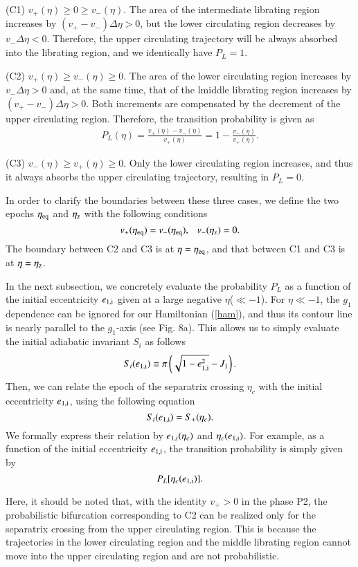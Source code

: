 \documentclass[useAMS,usenatbib,twocolumn]{mn2e}
\newcommand{\beq}{\begin{equation}}
\newcommand{\beqa}{\begin{eqnarray}}
\newcommand{\eeq}{\end{equation}}
\newcommand{\eeqa}{\end{eqnarray}}
\newcommand{\lmk}{\left(}
\newcommand{\rmk}{\right)}
\begin{document}
(C1) $v_+(\eta)\ge 0\ge v_-(\eta)$. The area of the intermediate librating region increases by $(v_+-v_-)\Delta \eta>0$, but the lower circulating region decreases by $v_- \Delta \eta<0$.  Therefore, the upper circulating trajectory will be always absorbed into the librating region, and we identically have  $P_L=1$.



(C2)  $v_+(\eta)\ge v_-(\eta)\ge 0$. The area of the lower circulating region increases by $v_-\Delta \eta>0$ and, at the same time, that of the lmiddle  librating region increases by $(v_+-v_-)\Delta \eta>0$. Both increments are compensated by the decrement of the  upper circulating region.  Therefore,  the  transition probability is given as
\beqa
P_L(\eta)=\frac{v_+(\eta)-v_-(\eta)}{v_+(\eta)}=1-\frac{v_{-}(\eta)}{v_{+}(\eta)}
\label{eq:prob}.
\eeqa

(C3)   $v_-(\eta)\ge v_+(\eta)\ge 0$.  Only the lower circulating region increases,  and thus it always absorbs the upper circulating trajectory, resulting in $P_L=0$.


In order to clarify the boundaries between these three cases, we define the two epochs $\eta_{\rm eq}$ and $\eta_{\rm z}$ with the following conditions
\beq
v_+(\eta_{\rm eq})=v_-(\eta_{\rm eq}),~~~
v_-(\eta_{\rm z})=0.
\eeq
The boundary between C2 and C3 is at $\eta=\eta_{\rm eq}$, and that between C1 and C3 is at $\eta=\eta_{\rm z}$. 


In the next subsection, we concretely evaluate the probability $P_L$ as a function of the initial eccentricity $e_{\rm 1,i}$ given at a large negative $\eta$($\ll -1$). For $\eta \ll -1$, the $g_1$ dependence can be ignored for our Hamiltonian (\ref{ham}), and thus its contour line is nearly parallel  to the $g_1$-axis (see Fig. 8a).  This allows us to simply evaluate the initial adiabatic invariant $S_i$ as follows
\beq
S_i(e_{\rm 1,i})\equiv \pi \lmk\sqrt{1-e_{\rm 1,i}^2}-J_1\rmk. \label{eli}
\eeq
Then, we can  relate the epoch of the separatrix crossing $\eta_c$ with the initial eccentricity $e_{\rm1,i}$, using the following equation
\beq
S_i(e_{\rm 1,i})=S_+(\eta_c). \label{trans}
\eeq
We formally express their relation by $e_{\rm 1,i}(\eta_c)$ and $\eta_c(e_{\rm 1,i})$.
For example, as a function of the initial eccentricity 
$e_{\rm 1,i}$, the transition probability is simply given by
\beq
P_L[\eta_c(e_{\rm 1,i})].
\eeq

Here, it should be noted that, with the identity $v_+>0$ in the phase P2, the probabilistic bifurcation corresponding to C2 can be realized only for the separatrix crossing from the upper circulating region. This is because the trajectories in the lower circulating region and the middle librating region cannot move into the upper circulating region and are not probabilistic.   
\end{document}
